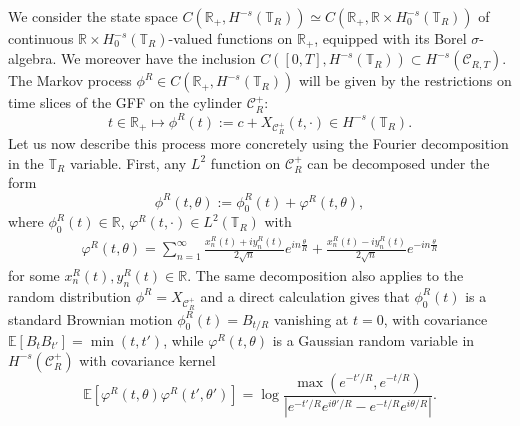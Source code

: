 \documentclass[11pt]{amsart}
\numberwithin{equation}{section}
\theoremstyle{definition}
\newcommand{\R}{\mathbb{R}}
\def\E{\mathbb{E}}
\newcommand{\mc}{\mathcal}
\def\T{\mathbb{T}}
\begin{document}
We consider the state space $C(\R_+, H^{-s}(\mathbb{T}_R))\simeq C(\R_+,\R\times H^{-s}_0(\T_R))$ of continuous 
$\R\times H^{-s}_0(\T_R)$-valued functions on $\R_+$, equipped with its Borel $\sigma$-algebra. We moreover have the inclusion 
$C([0,T],H^{-s}(\T_R))\subset H^{-s}(\mc{C}_{R,T})$. 
The Markov process $\phi^R \in C(\mathbb{R}_+, H^{-s}(\mathbb{T}_R))$ will be given by the restrictions on time slices 
of the GFF on the cylinder $\mc{C}_R^+$:
\begin{equation}\label{defPhi^Rt}  
t\in \R_+\mapsto \phi^R(t):=c+X_{\mc{C}_R^+}(t,\cdot)\in H^{-s}(\T_R).
\end{equation}
Let us now describe this process more concretely using the Fourier decomposition in the $\T_R$ variable. 
First, any $L^2$ function on $\mc{C}_R^+$ can be decomposed under the form
\begin{equation}
\phi^R(t,\theta)
:=
\phi^R_0(t) + \varphi^R(t,\theta),
\end{equation}
where $\phi_0^R(t)\in \R$, $\varphi^R(t,\cdot)\in L^2(\T_R)$ with
\begin{align}
 \varphi^R(t,\theta) = \sum_{n=1}^\infty \frac{x_n^R(t)+iy_n^R(t)}{2\sqrt{n}}
e^{in \frac{\theta}{R}}+\frac{x_n^R(t)-iy_n^R(t)}{2\sqrt{n}}
e^{-in \frac{\theta}{R}}
\end{align}
for some $x_n^R(t),y_n^R(t)\in \R$. The same decomposition also applies to the random distribution $\phi^R=X_{\mc{C}_R^+}$ and a direct calculation gives that $\phi_0^R(t)$ is a standard Brownian motion $\phi_0^R(t)=B_{t/R}$ vanishing at $t=0$, with covariance $\E[B_tB_{t'}]=\min(t,t')$, while $\varphi^R(t,\theta)$ is a Gaussian random variable in $H^{-s}(\mc{C}_R^+)$ with covariance kernel 
\begin{equation}\label{covvarphiR} 
\E[ \varphi^R(t,\theta) \varphi^R(t',\theta')]= \log \frac{\max(e^{-t'/R}, e^{-t/R})}{|e^{-t'/R} e^{i \theta'/R}- e^{-t/R} e^{i \theta/R} |}.\end{equation}
\end{document}
